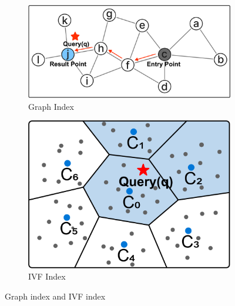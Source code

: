 \documentclass[sigconf, nonacm]{acmart}
\begin{document}
\begin{figure}
    \begin{subfigure}{0.60\columnwidth}
        \centering
        \setlength{\abovecaptionskip}{0cm}
        \setlength{\belowcaptionskip}{-0.3cm}
        \includegraphics[width=\linewidth]{figures/graph.pdf}
        \caption{Graph Index}
        \label{fig:graph}
    \end{subfigure}
    \hfill
    \begin{subfigure}{0.38\columnwidth}
        \centering
        \setlength{\abovecaptionskip}{0cm}
        \setlength{\belowcaptionskip}{-0.3cm}
        \includegraphics[width=\linewidth]{figures/ivf.pdf}
        \caption{IVF Index}
        \label{fig:ivf}
    \end{subfigure}
    \setlength{\abovecaptionskip}{0cm}
    \setlength{\belowcaptionskip}{0.2cm}
    \caption{Graph index and IVF index}
\end{figure}
\end{document}
